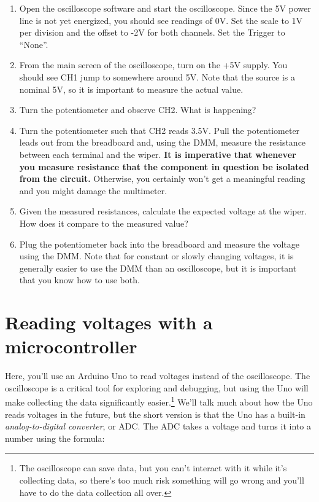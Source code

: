 \documentclass[11pt]{article} %
\begin{document}
\begin{enumerate}
\item Open the oscilloscope software and start the oscilloscope. Since the 5V power line is not yet energized, you should see readings of 0V. Set the scale to 1V per division and the offset to -2V for both channels. Set the Trigger to “None”. 
\item From the main screen of the oscilloscope, turn on the +5V supply. You should see CH1 jump to somewhere around 5V. Note that the source is a nominal 5V, so it is important to measure the actual value.
\item Turn the potentiometer and observe CH2. What is happening?
\item Turn the potentiometer such that CH2 reads 3.5V. Pull the potentiometer leads out from the breadboard and, using the DMM, measure the resistance between each terminal and the wiper. {\bf It is imperative that whenever you measure resistance that the component in question be isolated from the circuit.} Otherwise, you certainly won’t get a meaningful reading and you might damage the multimeter.
\item Given the measured resistances, calculate the expected voltage at the wiper. How does it compare to the measured value?
\item Plug the potentiometer back into the breadboard and measure the voltage using the DMM. Note that for constant or slowly changing voltages, it is generally easier to use the DMM than an oscilloscope, but it is important that you know how to use both.
\end{enumerate}

\section*{Reading voltages with a microcontroller}

Here, you’ll use an Arduino Uno to read voltages instead of the oscilloscope. The oscilloscope is a critical tool for exploring and debugging, but using the Uno will make collecting the data significantly easier.\footnote{The oscilloscope can save data, but you can’t interact with it while it’s collecting data, so there’s too much risk something will go wrong and you’ll have to do the data collection all over.} We’ll talk much about how the Uno reads voltages in the future, but the short version is that the Uno has a built-in \emph{analog-to-digital converter}, or ADC. The ADC takes a voltage and turns it into a number using the formula:
\end{document}
